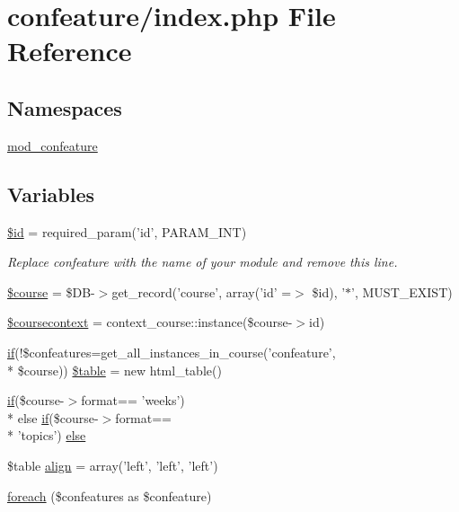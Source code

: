 \hypertarget{index_8php}{\section{confeature/index.php File Reference}
\label{index_8php}
}
\subsection*{Namespaces}
\begin{DoxyCompactItemize}
\item 
\hyperlink{namespacemod__confeature}{mod\-\_\-confeature}
\end{DoxyCompactItemize}
\subsection*{Variables}
\begin{DoxyCompactItemize}
\item 
\hyperlink{index_8php_ae97941710d863131c700f069b109991e}{\$id} = required\-\_\-param('id', P\-A\-R\-A\-M\-\_\-\-I\-N\-T)
\begin{DoxyCompactList}\small\item\em Replace confeature with the name of your module and remove this line. \end{DoxyCompactList}\item 
\hyperlink{index_8php_a0cbf208c448812ce49f3fe3b7de082be}{\$course} = \$D\-B-\/$>$get\-\_\-record('course', array('id' =$>$ \$id), '$\ast$', M\-U\-S\-T\-\_\-\-E\-X\-I\-S\-T)
\item 
\hyperlink{index_8php_a4a701989e53801a5375cfad4d1395ee8}{\$coursecontext} = context\-\_\-course\-::instance(\$course-\/$>$id)
\item 
\hyperlink{view_8php_abf65f0046bca4eaf168cd62bab83f411}{if}(!\$confeatures=get\-\_\-all\-\_\-instances\-\_\-in\-\_\-course('confeature', \\*
\$course)) \hyperlink{index_8php_a96b34b1df0434e68adafe20938e2864a}{\$table} = new html\-\_\-table()
\item 
\hyperlink{view_8php_abf65f0046bca4eaf168cd62bab83f411}{if}(\$course-\/$>$format== 'weeks') \\*
else \hyperlink{view_8php_abf65f0046bca4eaf168cd62bab83f411}{if}(\$course-\/$>$format== \\*
'topics') \hyperlink{index_8php_a0799edd8facb2c34db7e8afb18dad21b}{else}
\item 
\$table \hyperlink{index_8php_a8157eb76abbafb202f62b1c82d099159}{align} = array('left', 'left', 'left')
\item 
\hyperlink{index_8php_a1dfad6a7acd4569718f5bf04239e3e28}{foreach} (\$confeatures as \$confeature)
\end{DoxyCompactItemize}


